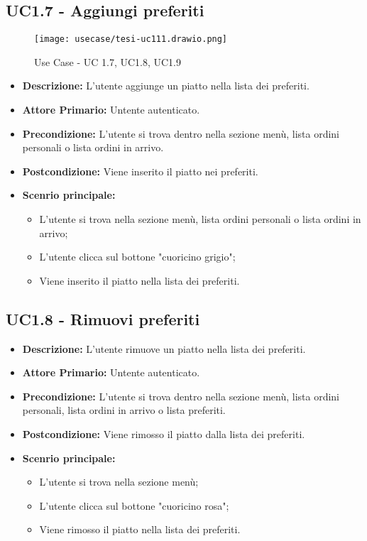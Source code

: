 \subsection{UC1.7 - Aggiungi preferiti}
\begin{figure}[H]
    \centering
    \texttt{[image: usecase/tesi-uc111.drawio.png]}
    \caption{Use Case - UC 1.7, UC1.8, UC1.9}
\end{figure}
\begin{itemize}
    \item \textbf{Descrizione:} L'utente aggiunge un piatto nella lista dei preferiti.
    \item \textbf{Attore Primario:} Untente autenticato.
    \item \textbf{Precondizione:} L'utente si trova dentro nella sezione menù, lista ordini personali o lista ordini in arrivo.
    \item \textbf{Postcondizione:} Viene inserito il piatto nei preferiti.
    \item \textbf{Scenrio principale:}
    \begin{itemize}
        \item L'utente si trova nella sezione menù, lista ordini personali o lista ordini in arrivo;
        \item L'utente clicca sul bottone "cuoricino grigio";
        \item Viene inserito il piatto nella lista dei preferiti.
    \end{itemize}
\end{itemize}
\subsection{UC1.8 - Rimuovi preferiti}
\begin{itemize}
    \item \textbf{Descrizione:} L'utente rimuove un piatto nella lista dei preferiti.
    \item \textbf{Attore Primario:} Untente autenticato.
    \item \textbf{Precondizione:} L'utente si trova dentro nella sezione menù, lista ordini personali, lista ordini in arrivo o lista preferiti.
    \item \textbf{Postcondizione:} Viene rimosso il piatto dalla lista dei preferiti.
    \item \textbf{Scenrio principale:}
    \begin{itemize}
        \item L'utente si trova nella sezione menù;
        \item L'utente clicca sul bottone "cuoricino rosa";
        \item Viene rimosso il piatto nella lista dei preferiti.
    \end{itemize}
\end{itemize}
